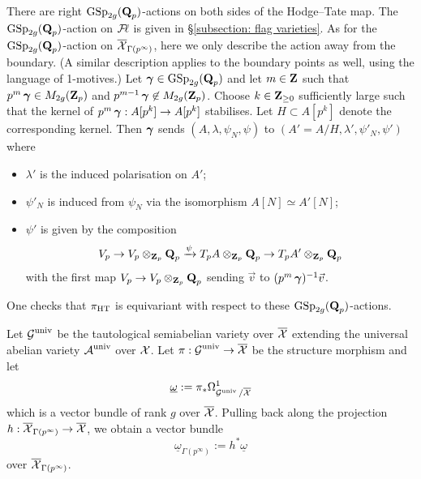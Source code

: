 \begin{Remark}\label{Remark: GSp2g-equivariance}
\normalfont There are right $\operatorname{GSp}_{2g}(\operatorname{\mathbf{Q}}_p)$-actions on both sides of the Hodge--Tate map. The $\operatorname{GSp}_{2g}(\operatorname{\mathbf{Q}}_p)$-action on $\operatorname{\mathcal{F}\!\mathbf{\ell}}$ is given in \S \ref{subsection: flag varieties}. As for the $\operatorname{GSp}_{2g}(\operatorname{\mathbf{Q}}_p)$-action on $\overline{\operatorname{\mathcal{X}}}_{\Gamma(p^{\infty})}$, here we only describe the action away from the boundary. (A similar description applies to the boundary points as well, using the language of 1-motives.) Let $\operatorname{\boldsymbol{\gamma}}\in \operatorname{GSp}_{2g}(\operatorname{\mathbf{Q}}_p)$ and let $m\in\operatorname{\mathbf{Z}}$ such that $p^m\operatorname{\boldsymbol{\gamma}}\in M_{2g}(\operatorname{\mathbf{Z}}_p)$ and $p^{m-1}\operatorname{\boldsymbol{\gamma}}\not\in M_{2g}(\operatorname{\mathbf{Z}}_p)$. Choose $k\in \operatorname{\mathbf{Z}}_{\geq 0}$ sufficiently large such that the kernel of $p^m\operatorname{\boldsymbol{\gamma}}: A[p^k]\rightarrow A[p^k]$ stabilises. Let $H\subset A[p^k]$ denote the corresponding kernel. Then $\operatorname{\boldsymbol{\gamma}}$ sends $(A, \lambda, \psi_N, \psi)$ to $(A'=A/H, \lambda', \psi'_N, \psi')$ where
\begin{itemize}
\item $\lambda'$ is the induced polarisation on $A'$;
\item $\psi'_N$ is induced from $\psi_N$ via the isomorphism $A[N]\simeq A'[N]$;
\item $\psi'$ is given by the composition
$$V_p\rightarrow V_p\otimes_{\operatorname{\mathbf{Z}}_p}\operatorname{\mathbf{Q}}_p\xrightarrow[]{\psi}T_pA\otimes_{\operatorname{\mathbf{Z}}_p}\operatorname{\mathbf{Q}}_p\rightarrow T_pA'\otimes_{\operatorname{\mathbf{Z}}_p}\operatorname{\mathbf{Q}}_p$$
with the first map $V_p\rightarrow V_p\otimes_{\operatorname{\mathbf{Z}}_p}\operatorname{\mathbf{Q}}_p$ sending $\vec{v}$ to $(p^m\operatorname{\boldsymbol{\gamma}})^{-1}\vec{v}$.
\end{itemize}
One checks that $\pi_{\operatorname{HT}}$ is equivariant with respect to these $\operatorname{GSp}_{2g}(\operatorname{\mathbf{Q}}_p)$-actions.
\end{Remark}

Let $\operatorname{\mathcal{G}}^{\operatorname{univ}}$ be the tautological semiabelian variety over $\overline{\operatorname{\mathcal{X}}}$ extending the universal abelian variety $\operatorname{\mathcal{A}}^{\operatorname{univ}}$ over $\operatorname{\mathcal{X}}$. Let $\pi: \operatorname{\mathcal{G}}^{\operatorname{univ}} \rightarrow \overline{\operatorname{\mathcal{X}}}$ be the structure morphism and let $$\underline{\omega}:=\pi_*\Omega^1_{\operatorname{\mathcal{G}}^{\operatorname{univ}}/\overline{\operatorname{\mathcal{X}}}}$$ which is a vector bundle of rank $g$ over $\overline{\operatorname{\mathcal{X}}}$. Pulling back along the projection $h: \overline{\operatorname{\mathcal{X}}}_{\Gamma(p^{\infty})}\rightarrow \overline{\operatorname{\mathcal{X}}}$, we obtain a vector bundle $$\underline{\omega}_{\Gamma(p^{\infty})}:=h^*\underline{\omega}$$ over $\overline{\operatorname{\mathcal{X}}}_{\Gamma(p^{\infty})}$.


